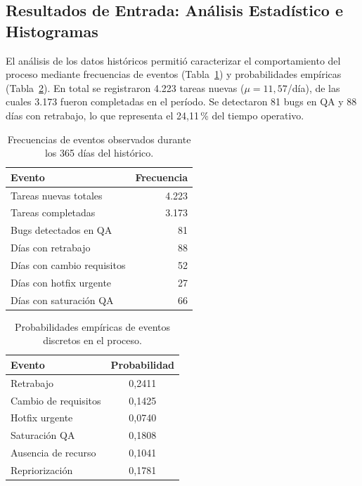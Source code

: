 \documentclass[12pt]{article}
\begin{document}
\subsection{Resultados de Entrada: Análisis Estadístico
                e Histogramas}
\label{subsec:resultados-entrada}

El análisis de los datos históricos permitió caracterizar el
comportamiento del proceso mediante frecuencias de eventos
(Tabla~\ref{tab:frecuencias}) y probabilidades empíricas
(Tabla~\ref{tab:probabilidades}). En total se registraron 4{.}223
tareas nuevas ($\mu = 11{,}57$/día), de las cuales 3{.}173 fueron
completadas en el período. Se detectaron 81 bugs en QA y 88 días con
retrabajo, lo que representa el 24{,}11\,\% del tiempo operativo.

\begin{table}[H]
  \centering
  \caption{Frecuencias de eventos observados durante los 365 días
           del histórico.}
  \label{tab:frecuencias}
  \begin{tabular}{lr}
    \toprule
    \textbf{Evento} & \textbf{Frecuencia} \\
    \midrule
    Tareas nuevas totales      & 4{.}223 \\
    Tareas completadas         & 3{.}173 \\
    Bugs detectados en QA      & 81      \\
    Días con retrabajo         & 88      \\
    Días con cambio requisitos & 52      \\
    Días con hotfix urgente    & 27      \\
    Días con saturación QA     & 66      \\
    \bottomrule
  \end{tabular}
\end{table}

\begin{table}[H]
  \centering
  \caption{Probabilidades empíricas de eventos discretos en el
           proceso.}
  \label{tab:probabilidades}
  \begin{tabular}{lc}
    \toprule
    \textbf{Evento} & \textbf{Probabilidad} \\
    \midrule
    Retrabajo            & 0{,}2411 \\
    Cambio de requisitos & 0{,}1425 \\
    Hotfix urgente       & 0{,}0740 \\
    Saturación QA        & 0{,}1808 \\
    Ausencia de recurso  & 0{,}1041 \\
    Repriorización       & 0{,}1781 \\
    \bottomrule
  \end{tabular}
\end{table}
\end{document}
